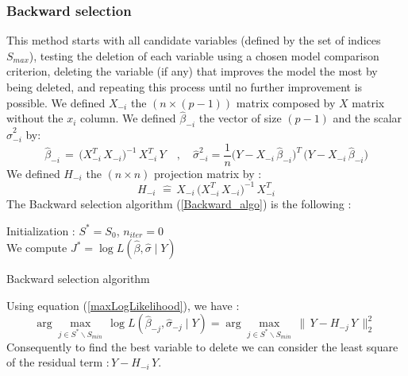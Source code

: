 \newpage
\subsubsection{Backward selection}
This method starts with all candidate variables 
(defined by the set of indices $S_{max}$), testing the deletion of each variable using a chosen model comparison criterion,
 deleting the variable (if any) that improves the model the most by being deleted, and repeating this process until no further improvement is possible.
We defined $X_{-i}$ the $(n \times (p-1))$ matrix composed by $X$ matrix without the $x_i$ column.
We defined $\hat{\beta}_{-i}$ the vector of size $(p-1)$ and the scalar $\hat{\sigma}_{-i}^2$ by:  
 \begin{equation}
  \hat{\beta}_{-i} \,=\, \big(X^T_{-i} \,X_{-i}\big)^{-1} \,X^T_{-i} \, Y
\quad,\quad 
\hat{\sigma}_{-i}^2 = \frac{1}{n}\big(Y-X_{-i} \,\hat{\beta}_{-i}\big)^T\,\big(Y-X_{-i} \,\hat{\beta}_{-i}\big)
\end{equation}
We defined $H_{-i}$ the $(n\times n)$ projection matrix by :
 \begin{equation}
\label{H-}
H_{-i}\, \,\hat{=}\, X_{-i}\,\big(X^T_{-i} \,X_{-i}\big)^{-1} \,X^T_{-i}
 \end{equation}
The Backward selection algorithm (\ref{Backward_algo}) is the following : 
\begin{algorithm}
\label{Backward_algo}
Initialization : $S^* = S_0$, $n_{iter} = 0 $\\
We compute $J^* = \log L(\hat{\beta},\hat{\sigma}\mid Y)$  \\
\caption{Backward selection algorithm }
\end{algorithm}

Using equation (\ref{maxLogLikelihood}), we have : 
 \begin{equation}
 \arg   \displaystyle\max_{j \in S^*\backslash S_{min}}\,  \log L(\hat{\beta}_{-j},\hat{\sigma}_{-j}\mid Y) = 
\arg \displaystyle\max_{j \in S^*\backslash S_{min}}\, \|\,Y-H_{-j}\,Y\,\|^2_2  \,\,
 \end{equation}
 Consequently to find the best variable to delete we can consider the least square of the residual term $:Y-H_{-i}\,Y$. 

